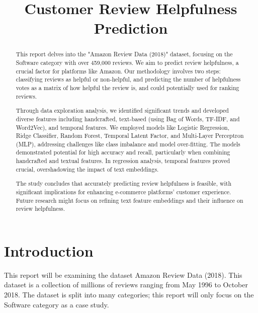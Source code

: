 \documentclass[final]{cvpr}
\begin{document}
\title{Customer Review Helpfulness Prediction}

\maketitle

\begin{abstract}
This report delves into the "Amazon Review Data (2018)" dataset, focusing on the Software category with over 459,000 reviews. 
We aim to predict review helpfulness, a crucial factor for platforms like Amazon. 
Our methodology involves two steps: classifying reviews as helpful or non-helpful, and predicting the number of helpfulness votes as a matrix of how helpful the review is, and could potentially used for ranking reviews.

Through data exploration analysis, we identified significant trends and developed diverse features including handcrafted, text-based (using Bag of Words, TF-IDF, and Word2Vec), and temporal features.
We employed models like Logistic Regression, Ridge Classifier, Random Forest, Temporal Latent Factor, and Multi-Layer Perceptron (MLP), addressing challenges like class imbalance and model over-fitting. 
The models demonstrated potential for high accuracy and recall, particularly when combining handcrafted and textual features. In regression analysis, temporal features proved crucial, overshadowing the impact of text embeddings.

The study concludes that accurately predicting review helpfulness is feasible, with significant implications for enhancing e-commerce platforms' customer experience. Future research might focus on refining text feature embeddings and their influence on review helpfulness.
\end{abstract}

\section{Introduction}

This report will be examining the dataset Amazon Review Data (2018)\cite{amazon}. This dataset is a collection of millions of reviews ranging from May 1996 to October 2018. The dataset is split into many categories; this report will only focus on the Software category as a case study. 
\end{document}
